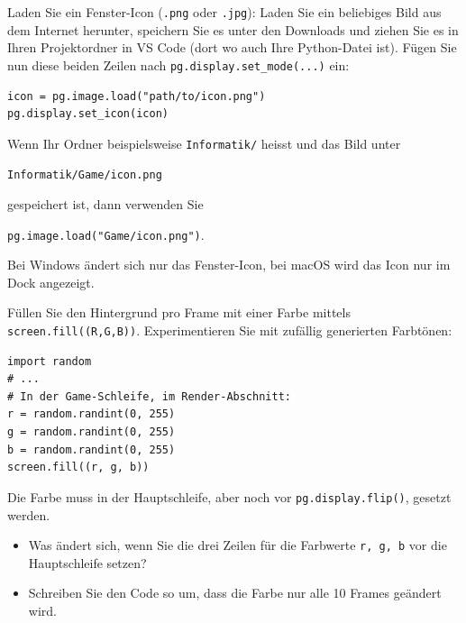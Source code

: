 \begin{mychallenge}
    Laden Sie ein Fenster-Icon (\texttt{.png} oder \texttt{.jpg}):
    Laden Sie ein beliebiges Bild aus dem Internet herunter, speichern Sie es unter den Downloads und ziehen Sie es in Ihren Projektordner in VS Code (dort wo auch Ihre Python-Datei ist). Fügen Sie nun diese beiden Zeilen nach \lstinline|pg.display.set_mode(...)| ein:

    \begin{lstlisting}
icon = pg.image.load("path/to/icon.png")
pg.display.set_icon(icon)
\end{lstlisting}

    Wenn Ihr Ordner beispielsweise \texttt{Informatik/} heisst und das Bild unter
    \begin{center}
    \texttt{Informatik/Game/icon.png}
    \end{center}
    gespeichert ist, dann verwenden Sie
    \begin{center}
            \lstinline|pg.image.load("Game/icon.png")|.
    \end{center}
    Bei Windows ändert sich nur das Fenster-Icon, bei macOS wird das Icon nur im Dock angezeigt.
    \begin{myanswer}
        
    \end{myanswer}
\end{mychallenge}

\begin{myexercise}
    Füllen Sie den Hintergrund pro Frame mit einer Farbe mittels \lstinline|screen.fill((R,G,B))|. Experimentieren Sie mit zufällig generierten Farbtönen:

    \begin{lstlisting}
import random
# ...
# In der Game-Schleife, im Render-Abschnitt:
r = random.randint(0, 255)
g = random.randint(0, 255)
b = random.randint(0, 255)
screen.fill((r, g, b))
\end{lstlisting}
    Die Farbe muss in der Hauptschleife, aber noch vor \lstinline|pg.display.flip()|, gesetzt werden.

    \begin{itemize}
        \item Was ändert sich, wenn Sie die drei Zeilen für die Farbwerte \lstinline|r, g, b| vor die Hauptschleife setzen?
        \item Schreiben Sie den Code so um, dass die Farbe nur alle 10 Frames geändert wird.
    \end{itemize}


    \begin{myanswer}
        
    \end{myanswer}
\end{myexercise}

